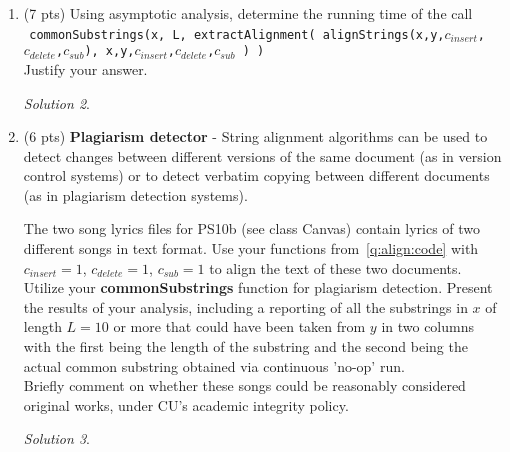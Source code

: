 \documentclass[12pt]{article}
\theoremstyle{remark}
\newtheorem*{solution}{Solution}
\begin{document}
\begin{enumerate}
\begin{enumerate}
	\textbf{Submit: }
	\begin{itemize}
	    \item A brief paragraph for each function that explains how you implemented it (describe how it works and how it uses its data structures).
	    \item Your code implementation, with code (the code should be submitted on Canvas)
	    \item The cost matrix $S$ that your code produces on the strings  x={\tt EXPONENTIAL} and y={\tt POLYNOMIAL} with $c_{insert} = 2$, $c_{delete} = 1$, $c_{sub} = 2$
	\end{itemize}
	\label{q:align:code}
	
	\begin{solution}
	
	
	\end{solution}
	
	
	\item (7 pts) Using asymptotic analysis, determine the running time of the call \\ ${}^{}$\hspace{0mm} {\tt commonSubstrings(x, L, extractAlignment(  alignStrings(x,y,$c_{insert}$,$c_{delete}$,$c_{sub}$), x,y,$c_{insert}$,$c_{delete}$,$c_{sub}$  )  )} \\
	Justify your answer.

	\begin{solution}
	
	
	\end{solution}



	\item (6 pts) \textbf{Plagiarism detector} - String alignment algorithms can be used to detect changes between different versions of the same document (as in version control systems) or to detect verbatim copying between different documents (as in plagiarism detection systems).
	
	The two {song lyrics} files for PS10b (see class Canvas) contain lyrics of two different songs in text format. Use your functions from~\eqref{q:align:code} with $c_{insert} = 1$, $c_{delete} = 1$, $c_{sub} = 1$ to align the text of these two documents. Utilize your \textbf{commonSubstrings} function for plagiarism detection. Present the results of your analysis, including a reporting of all the substrings in $x$ of length $L=10$ or more that could have been taken from $y$ in two columns with the first being the length of the substring and the second being the actual common substring obtained via continuous 'no-op' run.  \\Briefly comment on whether these songs could be reasonably considered original works, under CU's academic integrity policy.
	
	
	\begin{solution}
	
	
	\end{solution}
	
	\end{enumerate}
\end{enumerate}
\end{document}
